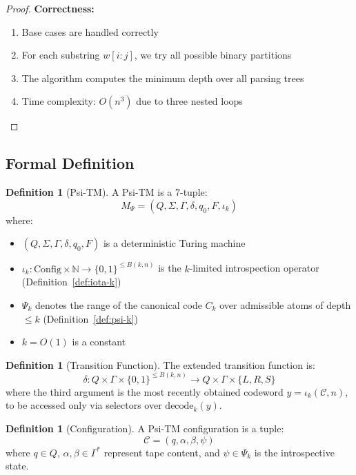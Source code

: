 \documentclass[11pt]{article}
\theoremstyle{definition}
\newtheorem{definition}[theorem]{Definition}
\newcommand{\bits}{\{0,1\}}
\begin{document}
\begin{proof}
\textbf{Correctness:}
\begin{enumerate}
\item Base cases are handled correctly
\item For each substring $w[i:j]$, we try all possible binary partitions
\item The algorithm computes the minimum depth over all parsing trees
\item Time complexity: $O(n^3)$ due to three nested loops
\end{enumerate}
\end{proof}

\subsection{Formal Definition}

\begin{definition}[Psi-TM]
A Psi-TM is a 7-tuple:
$$M_\Psi = (Q, \Sigma, \Gamma, \delta, q_0, F, \iota_k)$$
where:
\begin{itemize}
\item $(Q, \Sigma, \Gamma, \delta, q_0, F)$ is a deterministic Turing machine
\item $\iota_k: \mathrm{Config}\times \mathbb{N} \to \{0,1\}^{\le B(k,n)}$ is the $k$-limited introspection operator (Definition~\ref{def:iota-k})
\item $\Psi_k$ denotes the range of the canonical code $C_k$ over admissible atoms of depth $\le k$ (Definition~\ref{def:psi-k})
\item $k = O(1)$ is a constant
\end{itemize}
\end{definition}

\begin{definition}[Transition Function]
The extended transition function is:
$$\delta: Q \times \Gamma \times \bits^{\le B(k,n)} \to Q \times \Gamma \times \{L, R, S\}$$
where the third argument is the most recently obtained codeword $y=\iota_k(\mathcal{C},n)$, to be accessed only via selectors over $\mathrm{decode}_k(y)$.
\end{definition}

\begin{definition}[Configuration]
A Psi-TM configuration is a tuple:
$$\mathcal{C} = (q, \alpha, \beta, \psi)$$
where $q \in Q$, $\alpha, \beta \in \Gamma^*$ represent tape content, and $\psi \in \Psi_k$ is the introspective state.
\end{definition}
\end{document}
